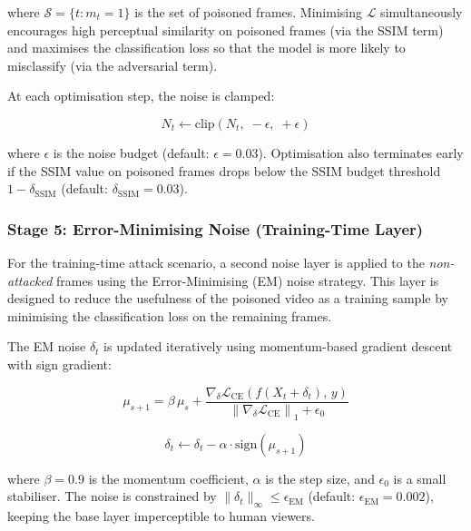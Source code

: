 \noindent
where $\mathcal{S} = \{t : m_t = 1\}$ is the set of poisoned frames.
Minimising $\mathcal{L}$ simultaneously encourages high
perceptual similarity on poisoned frames (via the SSIM term)
and maximises the classification loss so that the model is
more likely to misclassify (via the adversarial term).

At each optimisation step, the noise is clamped:

\begin{equation}
    N_t \leftarrow \mathrm{clip}\!\left(N_t,\; -\epsilon,\; +\epsilon\right)
    \label{eq:noise-clamp}
\end{equation}

\noindent
where $\epsilon$ is the noise budget (default: $\epsilon = 0.03$).
Optimisation also terminates early if the SSIM value on poisoned
frames drops below the SSIM budget threshold $1 - \delta_{\text{SSIM}}$
(default: $\delta_{\text{SSIM}} = 0.03$).

\subsubsection{Stage 5: Error-Minimising Noise (Training-Time Layer)}

For the training-time attack scenario, a second noise layer
is applied to the \emph{non-attacked} frames using the
Error-Minimising (EM) noise strategy. This layer is designed
to reduce the usefulness of the poisoned video as a training
sample by minimising the classification loss on the remaining
frames.

The EM noise $\delta_t$ is updated iteratively using
momentum-based gradient descent with sign gradient:

\begin{equation}
    \mu_{s+1} = \beta \, \mu_s
        + \frac{\nabla_{\delta} \mathcal{L}_{\text{CE}}\!\left(
            f(X_t + \delta_t),\, y
        \right)}{\left\lVert
            \nabla_{\delta} \mathcal{L}_{\text{CE}}
        \right\rVert_1 + \epsilon_0}
    \label{eq:em-momentum}
\end{equation}

\begin{equation}
    \delta_{t} \leftarrow \delta_{t} - \alpha \cdot \mathrm{sign}(\mu_{s+1})
    \label{eq:em-update}
\end{equation}

\noindent
where $\beta = 0.9$ is the momentum coefficient,
$\alpha$ is the step size, and $\epsilon_0$ is a small
stabiliser. The noise is constrained by
$\lVert \delta_t \rVert_\infty \leq \epsilon_{\text{EM}}$
(default: $\epsilon_{\text{EM}} = 0.002$),
keeping the base layer imperceptible to human viewers.


